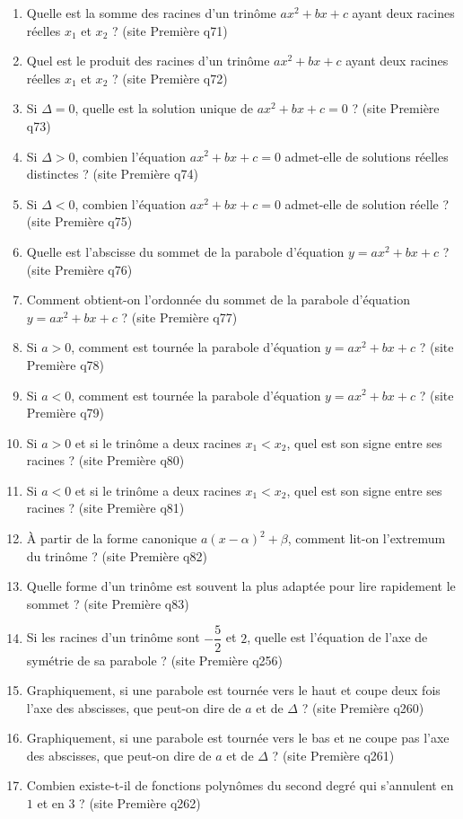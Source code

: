 \documentclass[11pt,a4paper]{article}
\newcommand{\sourceq}[1]{ {\scriptsize\textcolor{bleufonce}{(site Première q#1)}}}
\newcounter{question}
\newenvironment{blocquestions}[1]{%
  \begin{tcolorbox}[enhanced,breakable,colback=bleuclair,colframe=bleufonce,boxrule=0.6pt,arc=2mm,left=2mm,right=2mm,top=2mm,bottom=1.5mm,title={\bfseries #1},coltitle=white,colbacktitle=bleufonce,before skip=3mm,after skip=3mm, fontupper=\large]
  \large
  \begin{enumerate}[leftmargin=*,label=\textbf{\arabic*.},itemsep=0.85em,topsep=0.5em]
  \setcounter{enumi}{\value{question}}
}{%
  \setcounter{question}{\value{enumi}}
  \end{enumerate}
  \end{tcolorbox}
}
\begin{document}
\begin{blocquestions}{Questions flash -- Second degré}
  \item Quelle est la somme des racines d’un trinôme $ax^2+bx+c$ ayant deux racines réelles $x_1$ et $x_2$ ? \sourceq{71}
  \item Quel est le produit des racines d’un trinôme $ax^2+bx+c$ ayant deux racines réelles $x_1$ et $x_2$ ? \sourceq{72}
  \item Si $\Delta=0$, quelle est la solution unique de $ax^2+bx+c=0$ ? \sourceq{73}
  \item Si $\Delta>0$, combien l’équation $ax^2+bx+c=0$ admet-elle de solutions réelles distinctes ? \sourceq{74}
  \item Si $\Delta<0$, combien l’équation $ax^2+bx+c=0$ admet-elle de solution réelle ? \sourceq{75}
  \item Quelle est l’abscisse du sommet de la parabole d’équation $y=ax^2+bx+c$ ? \sourceq{76}
  \item Comment obtient-on l’ordonnée du sommet de la parabole d’équation $y=ax^2+bx+c$ ? \sourceq{77}
  \item Si $a>0$, comment est tournée la parabole d’équation $y=ax^2+bx+c$ ? \sourceq{78}
  \item Si $a<0$, comment est tournée la parabole d’équation $y=ax^2+bx+c$ ? \sourceq{79}
  \item Si $a>0$ et si le trinôme a deux racines $x_1<x_2$, quel est son signe entre ses racines ? \sourceq{80}
  \item Si $a<0$ et si le trinôme a deux racines $x_1<x_2$, quel est son signe entre ses racines ? \sourceq{81}
  \item À partir de la forme canonique $a(x-\alpha)^2+\beta$, comment lit-on l’extremum du trinôme ? \sourceq{82}
  \item Quelle forme d’un trinôme est souvent la plus adaptée pour lire rapidement le sommet ? \sourceq{83}
  \item Si les racines d'un trinôme sont $-\dfrac52$ et $2$, quelle est l'équation de l'axe de symétrie de sa parabole ? \sourceq{256}
  \item Graphiquement, si une parabole est tournée vers le haut et coupe deux fois l'axe des abscisses, que peut-on dire de $a$ et de $\Delta$ ? \sourceq{260}
  \item Graphiquement, si une parabole est tournée vers le bas et ne coupe pas l'axe des abscisses, que peut-on dire de $a$ et de $\Delta$ ? \sourceq{261}
  \item Combien existe-t-il de fonctions polynômes du second degré qui s'annulent en $1$ et en $3$ ? \sourceq{262}

\end{blocquestions}
\end{document}
